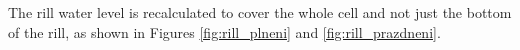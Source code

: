             The rill water level is recalculated to cover the whole cell and not just the
            bottom of the rill, as shown in Figures \ref{fig:rill_plneni} and
            \ref{fig:rill_prazdneni}.

